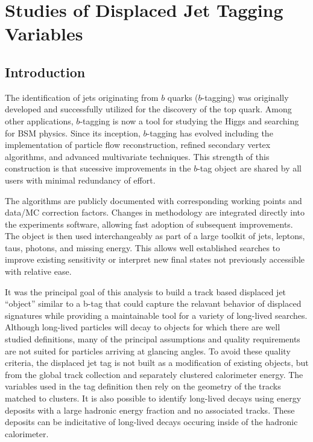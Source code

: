 \chapter{Studies of Displaced Jet Tagging Variables \label{ch:djstudies}}

\section{Introduction}

The identification of jets originating from $b$ quarks ($b$-tagging) was originally developed and successfully utilized for the discovery of the top quark.
 Among other applications, $b$-tagging is now a tool for studying the Higgs and searching for BSM physics.
 Since its inception, $b$-tagging has evolved including the implementation of particle flow reconstruction, refined secondary vertex algorithms, 
and advanced multivariate techniques. This strength of this construction is that sucessive improvements in the $b$-tag object are shared by all users 
with minimal redundancy of effort. 

The algorithms are publicly documented with corresponding working points and data/MC correction factors. Changes in methodology are integrated directly into
 the experiments software, allowing fast adoption of subsequent improvements.  
The object is then used interchangeably as part of a large toolkit of
 jets, leptons, taus, photons, and missing energy. This allows well
 established  searches to improve existing sensitivity  
or interpret new final states not previously accessible with relative ease.

It was the principal goal of this analysis to build a track based displaced jet ``object'' similar to a b-tag that could capture the relavant
behavior of displaced signatures while providing a maintainable tool for a variety of long-lived searches. Although long-lived particles
will decay to objects for which there are well studied definitions, many of the principal assumptions and quality requirements are not suited for particles
arriving at glancing angles. To avoid these quality criteria, the displaced jet tag is not built as a modification of existing objects, but
from the global track collection and separately clustered calorimeter energy. The variables used in the tag definition then rely on the
 geometry of the tracks matched to clusters. It is also possible to identify long-lived decays using energy deposits with a large hadronic energy fraction 
and no associated tracks. These deposits can be indicitative of long-lived decays occuring inside of the hadronic calorimeter. 

